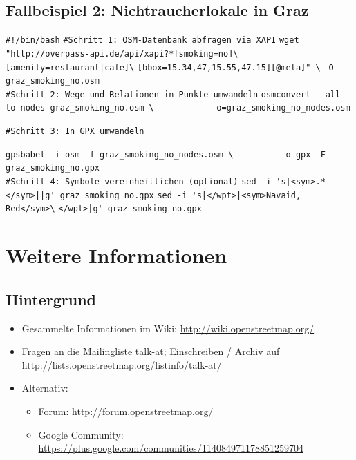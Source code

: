 \documentclass{beamer}
\begin{document}
\subsection{Fallbeispiel 2: Nichtraucherlokale in Graz}
\begin{frame}[fragile]

\verb+#!/bin/bash+
\verb+#Schritt 1: OSM-Datenbank abfragen via XAPI+
\verb+wget "http://overpass-api.de/api/xapi?*[smoking=no]\+
\verb+[amenity=restaurant|cafe]\+
\verb+[bbox=15.34,47,15.55,47.15][@meta]" \+
\verb+-O graz_smoking_no.osm+
\\
\verb+#Schritt 2: Wege und Relationen in Punkte umwandeln+
\verb+osmconvert --all-to-nodes graz_smoking_no.osm \+
\verb+           -o=graz_smoking_no_nodes.osm+
\end{frame}
\begin{frame}[fragile]


\verb+#Schritt 3: In GPX umwandeln +

\verb+gpsbabel -i osm -f graz_smoking_no_nodes.osm \+
\verb+         -o gpx -F graz_smoking_no.gpx+
\\
\verb+#Schritt 4: Symbole vereinheitlichen (optional)+
\verb+sed -i 's|<sym>.*</sym>||g' graz_smoking_no.gpx+
\verb+sed -i 's|</wpt>|<sym>Navaid, Red</sym>\+
\verb+</wpt>|g' graz_smoking_no.gpx+
\end{frame}

\section{Weitere Informationen}

\subsection{Hintergrund}
\begin{frame}
\begin{itemize}
  \item Gesammelte Informationen im Wiki:
    \url{http://wiki.openstreetmap.org/}
  \item Fragen an die Mailingliste talk-at; Einschreiben / Archiv auf \url{http://lists.openstreetmap.org/listinfo/talk-at/}
  \item Alternativ:
  \begin{itemize}
    \item Forum: \url{http://forum.openstreetmap.org/}
    \item Google Community: \url{https://plus.google.com/communities/114084971178851259704}
  \end{itemize}
\end{itemize}
\end{frame}
\end{document}
